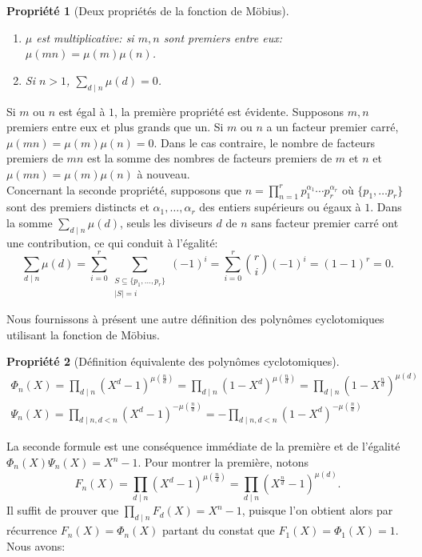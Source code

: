 \documentclass{article}
\theoremstyle{break}                  %
\newtheorem{propriete}{Propriété}
\begin{document}
\begin{propriete}[Deux propriétés de la fonction de Möbius]
	\begin{enumerate}
		\item $\mu$ est multiplicative: si $m,n $ sont premiers entre eux: $\mu(mn)= \mu(m)\mu(n)$.
		\item Si $n >1$, $\displaystyle \sum_{d \mid n} \mu(d) = 0$.
	\end{enumerate}
\end{propriete}
Si $m$ ou $n$ est égal à $1$, la première propriété est évidente. Supposons $m,n$ premiers entre eux et plus grands que un. Si $m$ ou $n$ a un facteur premier carré,  $\mu(mn)=\mu(m)\mu(n) = 0$. Dans le cas contraire, le nombre de facteurs premiers de $mn$ est la somme des nombres de facteurs premiers de $m$ et $n$ et $\mu(mn)=\mu(m)\mu(n)$ à nouveau.\\

Concernant la seconde propriété, supposons que $n = \displaystyle \prod_{n = 1}^r p_1^{\alpha_1} \cdots p_r^{\alpha_r}$ où $\{p_1, \dots p_r\}$ sont des premiers distincts et $\alpha_1, \dots, \alpha_r$ des entiers supérieurs ou égaux à $1$. Dans la somme $\displaystyle \sum_{d \mid n} \mu(d)$, seuls les diviseurs $d$ de $n$ sans facteur premier carré ont une contribution, ce qui conduit à l'égalité:
$$\sum_{d \mid n} \mu(d) = \sum_{i = 0}^{r}\sum_{\substack{S \subseteq \{p_1, \dots, p_r\}\\ \left\vert S \right\vert = i}} (-1)^i = \sum_{i = 0}^{r} \binom{r}{i}(-1)^i =(1-1)^r=0.$$

Nous fournissons à présent une autre définition des polynômes cyclotomiques utilisant la fonction de Möbius.

\begin{propriete}[Définition équivalente des polynômes cyclotomiques]
	\begin{align}		
		\Phi_n(X) = \prod_{d \mid n} (X^d - 1)^{\mu(\frac{n}{d})} = \prod_{d \mid n} (1 - X^d)^{\mu(\frac{n}{d})} = \prod_{d \mid n} (1 - X^\frac{n}{d})^{\mu(d)} \tag{2.4}\label{mobphi}\\
		\Psi_n(X) = \prod_{d \mid n, d<n} (X^d - 1)^{-\mu(\frac{n}{d})} = -\prod_{d \mid n, d<n} (1 - X^d)^{-\mu(\frac{n}{d})}\tag{2.5}\label{mobpsi}
	\end{align}
\end{propriete}

La seconde formule est une conséquence immédiate de la première et de l'égalité $\Phi_n(X) \Psi_n(X) = X^n-1$. Pour montrer la première, notons
$$F_n(X) = \prod_{d \mid n} (X^d - 1)^{\mu(\frac{n}{d})} = \prod_{d \mid n} (X^{\frac{n}{d}} - 1)^{\mu(d)}.$$ Il suffit de prouver que $\displaystyle \prod_{ d \mid n} F_d(X) = X^n-1$, puisque l'on obtient alors par récurrence $F_n(X) = \Phi_n(X)$ partant du constat que $F_1(X) = \Phi_1(X) = 1$. Nous avons:
\end{document}
